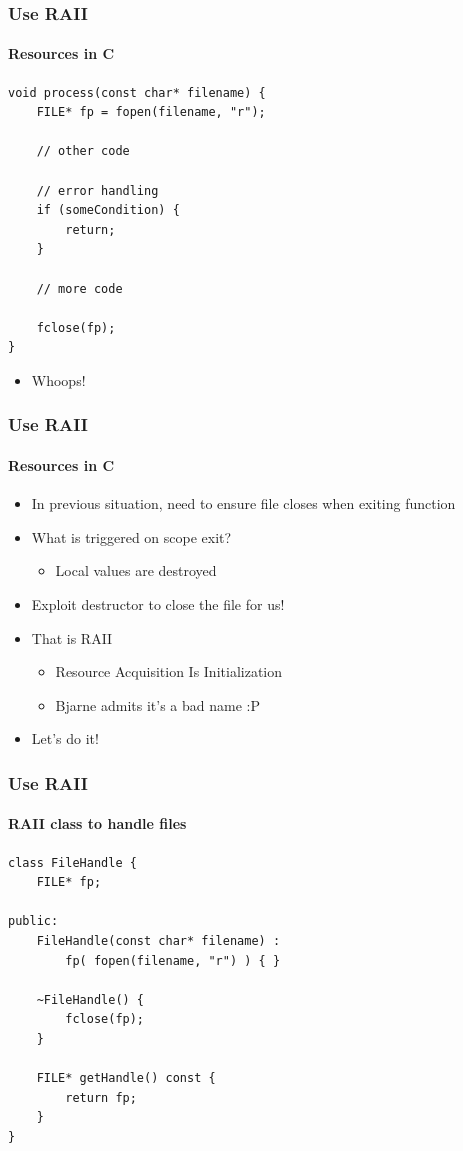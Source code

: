 \documentclass[table]{beamer}
\newcounter{rulecount}
\newcommand{\declarerule}{\textbf{\color{themeblue}{Rule \therulecount:}} }
\begin{document}
\begin{frame}[fragile]
    \frametitle{\declarerule Use RAII}
    \framesubtitle{Resources in C}
    \begin{lstlisting}[title=Forgetting to close]
void process(const char* filename) {
    FILE* fp = fopen(filename, "r");

    // other code

    // error handling
    if (someCondition) {
        return;
    }

    // more code

    fclose(fp);
}
    \end{lstlisting}
    \begin{itemize}
        \item Whoops!
    \end{itemize}
\end{frame}

\begin{frame}
    \frametitle{\declarerule Use RAII}
    \framesubtitle{Resources in C}
    \begin{itemize}
        \item In previous situation, need to ensure file closes when exiting function
        \item What is triggered on scope exit?
            \begin{itemize}
                \item Local values are destroyed
            \end{itemize}
        \item Exploit destructor to close the file for us!
        \item That is RAII
            \begin{itemize}
                \item Resource Acquisition Is Initialization
                \item Bjarne admits it's a bad name :P
            \end{itemize}
        \item Let's do it!
    \end{itemize}
\end{frame}

\begin{frame}[fragile]
    \frametitle{\declarerule Use RAII}
    \framesubtitle{RAII class to handle files}
    \begin{lstlisting}[title=Problems begone!]
class FileHandle {
    FILE* fp;

public:
    FileHandle(const char* filename) :
        fp( fopen(filename, "r") ) { }

    ~FileHandle() {
        fclose(fp);
    }

    FILE* getHandle() const {
        return fp;
    }
}
    \end{lstlisting}
\end{frame}
\end{document}

